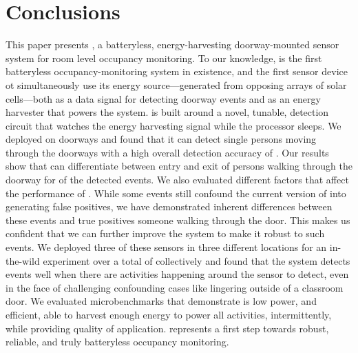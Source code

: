 \section{Conclusions}
\label{sec:conclusions}

This paper presents \sysname, a batteryless, energy-harvesting doorway-mounted sensor system for room level occupancy monitoring.
To our knowledge, \sysname is the first batteryless occupancy-monitoring system in existence, and the first sensor device ot simultaneously use its energy source---generated from opposing arrays of solar cells---both as a data signal for detecting doorway events and as an energy harvester that powers the system.
\sysname is built around a novel, tunable, detection circuit that watches the energy harvesting signal while the processor sleeps.
We deployed \sysname on \numDoors doorways and found that it can detect single persons moving through the doorways with a high overall detection accuracy of \SysAccuracy. Our results show that \sysname can differentiate between entry and exit of persons walking through the doorway for \dirAccuracy of the detected events.
We also evaluated different factors that affect the performance of \sysname.  
While some events still confound the current version of \sysname into generating false positives, we have demonstrated inherent differences between these events and true positives \ie someone walking through the door.
This makes us confident that we can further improve the \sysname system to make it robust to such events.
We deployed three of these sensors in three different locations for an in-the-wild experiment over a total of \ITWdays collectively and found that the system detects events well when there are activities happening around the sensor to detect, even in the face of challenging confounding cases like lingering outside of a classroom door.
We evaluated \sysname microbenchmarks that demonstrate \sysname is low power, and efficient, able to harvest enough energy to power all activities, intermittently, while providing quality of application.
\sysname represents a first step towards robust, reliable, and truly batteryless occupancy monitoring.
